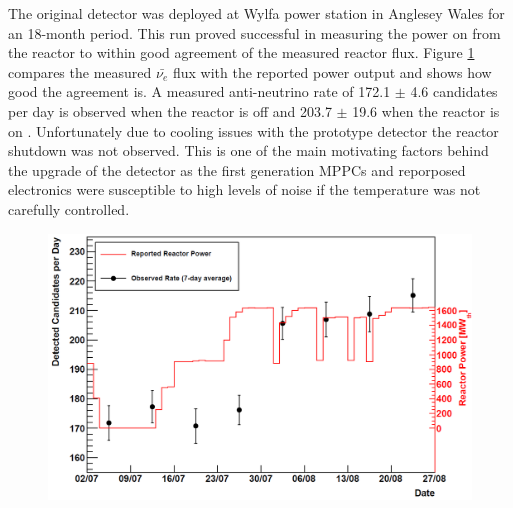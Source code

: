 The original detector was deployed at Wylfa power station in Anglesey Wales for an 18-month period. This run proved successful in measuring the power on from the reactor to within good agreement of the measured reactor flux. Figure \ref{fig:prototypeMeasumentFlux} compares the measured $\bar{\nu_e}$ flux with the reported power output and shows how good the agreement is. A measured anti-neutrino rate of 172.1 $\pm$ 4.6 candidates per day is observed when the reactor is off and 203.7 $\pm$ 19.6 when the reactor is on \cite{Carroll_2018}. Unfortunately due to cooling issues with the prototype detector the reactor shutdown was not observed. This is one of the main motivating factors behind the upgrade of the detector as the first generation MPPCs and reporposed electronics were susceptible to high levels of noise if the temperature was not carefully controlled. 
\begin{figure}[htbp]
 \centering
 \includegraphics[width=0.90\linewidth]{Chapter2/Figs/Raster/prototypeMeasureOnFig.png} 
 \label{fig:prototypeMeasumentFlux}
\end{figure}

